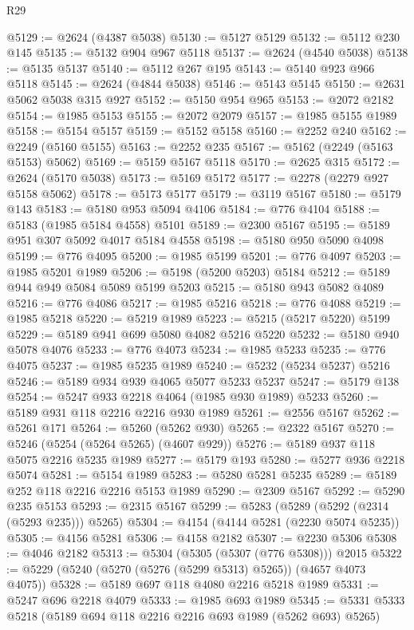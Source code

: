 \begin{lexlean}{R29}
\begin{coremodule}
@5129 := @2624 (@4387 @5038)
@5130 := @5127 @5129
@5132 := @5112 @230 @145
@5135 := @5132 @904 @967 @5118
@5137 := @2624 (@4540 @5038)
@5138 := @5135 @5137
@5140 := @5112 @267 @195
@5143 := @5140 @923 @966 @5118
@5145 := @2624 (@4844 @5038)
@5146 := @5143 @5145
@5150 := @2631 @5062 @5038 @315 @927
@5152 := @5150 @954 @965
@5153 := @2072 @2182
@5154 := @1985 @5153
@5155 := @2072 @2079
@5157 := @1985 @5155 @1989
@5158 := @5154 @5157
@5159 := @5152 @5158
@5160 := @2252 @240
@5162 := @2249 (@5160 @5155)
@5163 := @2252 @235
@5167 := @5162 (@2249 (@5163 @5153) @5062)
@5169 := @5159 @5167 @5118
@5170 := @2625 @315
@5172 := @2624 (@5170 @5038)
@5173 := @5169 @5172
@5177 := @2278 (@2279 @927 @5158 @5062)
@5178 := @5173 @5177
@5179 := @3119 @5167
@5180 := @5179 @143
@5183 := @5180 @953 @5094 @4106
@5184 := @776 @4104
@5188 := @5183 (@1985 @5184 @4558) @5101
@5189 := @2300 @5167
@5195 := @5189 @951 @307 @5092 @4017 @5184 @4558
@5198 := @5180 @950 @5090 @4098
@5199 := @776 @4095
@5200 := @1985 @5199
@5201 := @776 @4097
@5203 := @1985 @5201 @1989
@5206 := @5198 (@5200 @5203) @5184
@5212 := @5189 @944 @949 @5084 @5089 @5199 @5203
@5215 := @5180 @943 @5082 @4089
@5216 := @776 @4086
@5217 := @1985 @5216
@5218 := @776 @4088
@5219 := @1985 @5218
@5220 := @5219 @1989
@5223 := @5215 (@5217 @5220) @5199
@5229 := @5189 @941 @699 @5080 @4082 @5216 @5220
@5232 := @5180 @940 @5078 @4076
@5233 := @776 @4073
@5234 := @1985 @5233
@5235 := @776 @4075
@5237 := @1985 @5235 @1989
@5240 := @5232 (@5234 @5237) @5216
@5246 := @5189 @934 @939 @4065 @5077 @5233 @5237
@5247 := @5179 @138
@5254 := @5247 @933 @2218 @4064 (@1985 @930 @1989) @5233
@5260 := @5189 @931 @118 @2216 @2216 @930 @1989
@5261 := @2556 @5167
@5262 := @5261 @171
@5264 := @5260 (@5262 @930)
@5265 := @2322 @5167
@5270 := @5246 (@5254 (@5264 @5265) (@4607 @929))
@5276 := @5189 @937 @118 @5075 @2216 @5235 @1989
@5277 := @5179 @193
@5280 := @5277 @936 @2218 @5074
@5281 := @5154 @1989
@5283 := @5280 @5281 @5235
@5289 := @5189 @252 @118 @2216 @2216 @5153 @1989
@5290 := @2309 @5167
@5292 := @5290 @235 @5153
@5293 := @2315 @5167
@5299 := @5283 (@5289 (@5292 (@2314 (@5293 @235))) @5265)
@5304 := @4154 (@4144 @5281 (@2230 @5074 @5235))
@5305 := @4156 @5281
@5306 := @4158 @2182
@5307 := @2230 @5306
@5308 := @4046 @2182
@5313 := @5304 (@5305 (@5307 (@776 @5308))) @2015
@5322 := @5229 (@5240 (@5270 (@5276 (@5299 @5313) @5265)) (@4657 @4073 @4075))
@5328 := @5189 @697 @118 @4080 @2216 @5218 @1989
@5331 := @5247 @696 @2218 @4079
@5333 := @1985 @693 @1989
@5345 := @5331 @5333 @5218 (@5189 @694 @118 @2216 @2216 @693 @1989 (@5262 @693) @5265)

\end{coremodule}
\end{lexlean}
